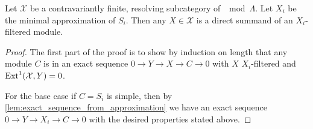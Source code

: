 \begin{theorem} \cite[3.8]{AR91} \label{thm:contravariantly_finite_resolving_is_Xi_filtered}
	Let $\mathcal X$ be a contravariantly finite, resolving subcategory of $\mod \Lambda$. Let $X_i$ be the minimal approximation of $S_i$. Then any $X \in \mathcal X$ is a direct summand of an $X_i$-filtered module.
	\begin{proof}
		The first part of the proof is to show by induction on length that any module $C$ is in an exact sequence $0 \to Y \to X \to C \to 0$ with $X$ $X_i$-filtered and $\operatorname{Ext}^1(\mathcal X, Y)=0$.
		
		For the base case if $C=S_i$ is simple, then by \cref{lem:exact_sequence_from_approximation} we have an exact sequence $0 \to Y \to X_i \to C \to 0$ with the desired properties stated above. 
		

\end{proof}
\end{theorem}
